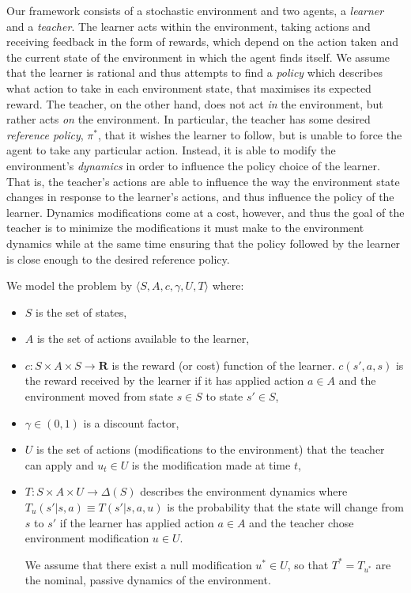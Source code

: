 \documentclass[letterpaper]{aamas2010}
\begin{document}
Our framework consists of a stochastic environment and two agents, a
\emph{learner} and a \emph{teacher}.  The learner acts within the
environment, taking actions and receiving feedback in the form of
rewards, which depend on the action taken and the current state of the
environment in which the agent finds itself.  We assume that the
learner is rational and thus attempts to find a \emph{policy} which
describes what action to take in each environment state, that
maximises its expected reward.  The teacher, on the other hand, does
not act \emph{in} the environment, but rather acts \emph{on} the
environment.  In particular, the teacher has some desired
\emph{reference policy}, $\pi^*$, that it wishes the learner to
follow, but is unable to force the agent to take any particular
action.  Instead, it is able to modify the environment's
\emph{dynamics} in order to influence the policy choice of the
learner. That is, the teacher's actions are able to influence the way
the environment state changes in response to the learner's actions,
and thus influence the policy of the learner. Dynamics modifications
come at a cost, however, and thus the goal of the teacher is to
minimize the modifications it must make to the environment dynamics
while at the same time ensuring that the policy followed by the
learner is close enough to the desired reference policy.

We model the problem by $\langle S, A, c,\gamma, U,T\rangle$ where:
\begin{itemize}
\item $S$ is the set of states, 
\item $A$ is the set of actions available to the learner,
\item  $c:S\times A\times S\rightarrow\mathbf{R}$ is the reward (or
  cost) function of the learner. $c(s',a,s)$ is the reward received by
  the learner if it has applied action $a\in A$ and the environment
  moved from state $s\in S$ to state $s'\in S$,
\item $\gamma \in (0,1)$ is a discount factor,   

\item $U$ is the set of actions (modifications to the environment)
  that the teacher can apply and $u_t\in U$ is the modification made
  at time $t$,

\item $T:S\times A\times U\rightarrow\Delta(S)$ describes the
  environment dynamics where $T_u(s'|s,a)\equiv T(s'|s,a,u)$ is the
  probability that the state will change from $s$ to $s'$ if the
  learner has applied action $a\in A$ and the teacher chose
  environment modification $u\in U$.

 
We assume that there exist a null
  modification $u^*\in U$, so that $T^*=T_{u^*}$ are the nominal,
  passive dynamics of the environment.
\end{itemize}
\end{document}
